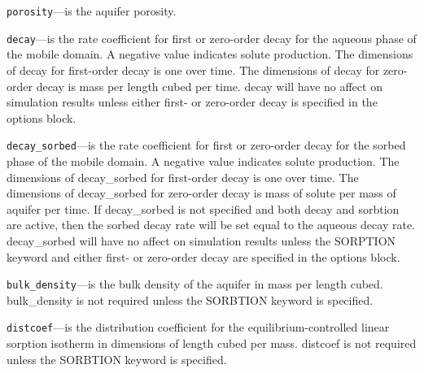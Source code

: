 \begin{description}
\item \texttt{porosity}---is the aquifer porosity.

\item \texttt{decay}---is the rate coefficient for first or zero-order decay for the aqueous phase of the mobile domain.  A negative value indicates solute production.  The dimensions of decay for first-order decay is one over time.  The dimensions of decay for zero-order decay is mass per length cubed per time.  decay will have no affect on simulation results unless either first- or zero-order decay is specified in the options block.

\item \texttt{decay\_sorbed}---is the rate coefficient for first or zero-order decay for the sorbed phase of the mobile domain.  A negative value indicates solute production.  The dimensions of decay\_sorbed for first-order decay is one over time.  The dimensions of decay\_sorbed for zero-order decay is mass of solute per mass of aquifer per time.  If decay\_sorbed is not specified and both decay and sorbtion are active, then the sorbed decay rate will be set equal to the aqueous decay rate.  decay\_sorbed will have no affect on simulation results unless the SORPTION keyword and either first- or zero-order decay are specified in the options block.

\item \texttt{bulk\_density}---is the bulk density of the aquifer in mass per length cubed.  bulk\_density is not required unless the SORBTION keyword is specified.

\item \texttt{distcoef}---is the distribution coefficient for the equilibrium-controlled linear sorption isotherm in dimensions of length cubed per mass.  distcoef is not required unless the SORBTION keyword is specified.

\end{description}

